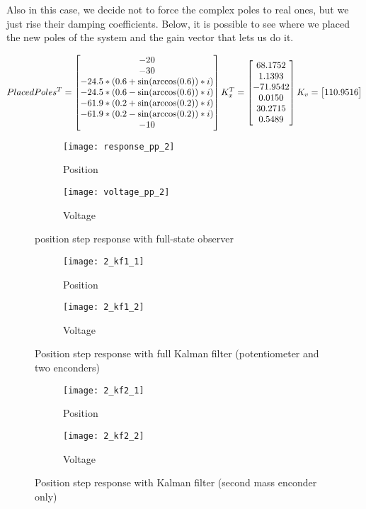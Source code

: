 Also in this case, we decide not to force the complex poles to real ones, but we just rise their damping coefficients. Below, it is possible to see where we placed the new poles of the system and the gain vector that lets us do it.

\begin{equation}
	PlacedPoles^{T} =
	\begin{bmatrix}
		-20 \\ -30 \\ -24.5*(0.6+\sin(\arccos(0.6))*i) \\ -24.5*(0.6-\sin(\arccos(0.6))*i) \\
		-61.9*(0.2+\sin(\arccos(0.2))*i) \\ -61.9*(0.2-\sin(\arccos(0.2))*i) \\ -10
	\end{bmatrix}
	K_x^{T} =
	\begin{bmatrix}
		68.1752  \\  1.1393 \\ -71.9542 \\   0.0150 \\  30.2715  \\  0.5489
	\end{bmatrix}
	\\
	K_v =
	\begin{bmatrix}
		110.9516
	\end{bmatrix}
\end{equation}

\begin{figure*}[h]
	\centering
	\begin{subfigure}{0.5\columnwidth}
		\texttt{[image: response\_pp\_2]}
		\caption{Position}
	\end{subfigure}
	\begin{subfigure}{0.45\columnwidth}
		\texttt{[image: voltage\_pp\_2]}
		\caption{Voltage}
	\end{subfigure}
	\caption{position step response with full-state observer}
\end{figure*}

\begin{figure*}[h]
	\centering
	\begin{subfigure}{0.5\columnwidth}
		\texttt{[image: 2\_kf1\_1]}
		\caption{Position}
	\end{subfigure}
	\begin{subfigure}{0.45\columnwidth}
		\texttt{[image: 2\_kf1\_2]}
		\caption{Voltage}
	\end{subfigure}
	\caption{Position step response with full Kalman filter (potentiometer and two enconders)}
\end{figure*}

\begin{figure*}[h]
	\centering
	\begin{subfigure}{0.5\columnwidth}
		\texttt{[image: 2\_kf2\_1]}
		\caption{Position}
	\end{subfigure}
	\begin{subfigure}{0.45\columnwidth}
		\texttt{[image: 2\_kf2\_2]}
		\caption{Voltage}
	\end{subfigure}
	\caption{Position step response with Kalman filter (second mass enconder only)}
\end{figure*}
